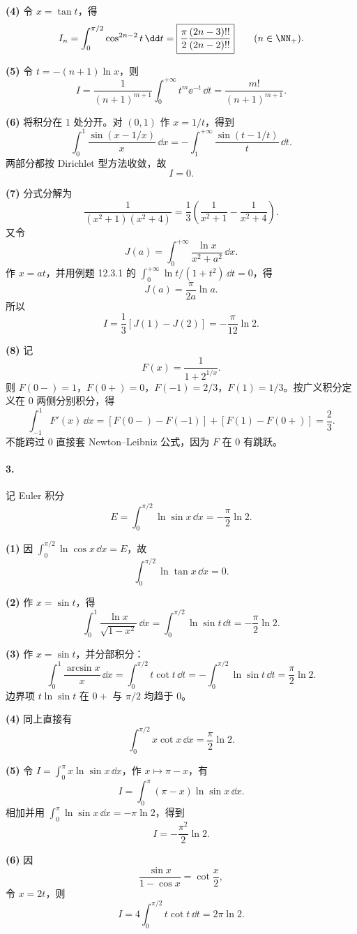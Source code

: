 \textbf{(4)} 令 $x=\tan t$，得
\[
  I_n=\int_0^{\pi/2}\cos^{2n-2}t\,\dd t
  =\boxed{\frac\pi2\frac{(2n-3)!!}{(2n-2)!!}}
  \qquad(n\in\NN_+).
\]

\textbf{(5)} 令 $t=-(n+1)\ln x$，则
\[
  I=\frac1{(n+1)^{m+1}}\int_0^{+\infty}t^m\ee^{-t}\,\dd t
  =\boxed{\frac{m!}{(n+1)^{m+1}}}.
\]

\textbf{(6)} 将积分在 $1$ 处分开。对 $(0,1)$ 作 $x=1/t$，得到
\[
  \int_0^1\frac{\sin(x-1/x)}x\,\dd x
  =-\int_1^{+\infty}\frac{\sin(t-1/t)}t\,\dd t.
\]
两部分都按 Dirichlet 型方法收敛，故
\[
  \boxed{I=0}.
\]

\textbf{(7)} 分式分解为
\[
  \frac1{(x^2+1)(x^2+4)}
  =\frac13\left(\frac1{x^2+1}-\frac1{x^2+4}\right).
\]
又令
\[
  J(a)=\int_0^{+\infty}\frac{\ln x}{x^2+a^2}\,\dd x.
\]
作 $x=at$，并用例题 12.3.1 的 $\int_0^{+\infty}\ln t/(1+t^2)\,\dd t=0$，得
\[
  J(a)=\frac\pi{2a}\ln a.
\]
所以
\[
  \boxed{I=\frac13[J(1)-J(2)]=-\frac\pi{12}\ln2.}
\]

\textbf{(8)} 记
\[
  F(x)=\frac1{1+2^{1/x}}.
\]
则 $F(0-)=1$，$F(0+)=0$，$F(-1)=2/3$，$F(1)=1/3$。按广义积分定义在 $0$ 两侧分别积分，得
\[
  \int_{-1}^1F'(x)\,\dd x
  =[F(0-)-F(-1)]+[F(1)-F(0+)]
  =\boxed{\frac23}.
\]
不能跨过 $0$ 直接套 Newton--Leibniz 公式，因为 $F$ 在 $0$ 有跳跃。

\paragraph{3.}
记 Euler 积分
\[
  E=\int_0^{\pi/2}\ln\sin x\,\dd x=-\frac\pi2\ln2.
\]

\textbf{(1)} 因 $\int_0^{\pi/2}\ln\cos x\,\dd x=E$，故
\[
  \boxed{\int_0^{\pi/2}\ln\tan x\,\dd x=0}.
\]

\textbf{(2)} 作 $x=\sin t$，得
\[
  \boxed{\int_0^1\frac{\ln x}{\sqrt{1-x^2}}\,\dd x
  =\int_0^{\pi/2}\ln\sin t\,\dd t=-\frac\pi2\ln2.}
\]

\textbf{(3)} 作 $x=\sin t$，并分部积分：
\[
  \int_0^1\frac{\arcsin x}{x}\,\dd x
  =\int_0^{\pi/2}t\cot t\,\dd t
  =-\int_0^{\pi/2}\ln\sin t\,\dd t
  =\boxed{\frac\pi2\ln2}.
\]
边界项 $t\ln\sin t$ 在 $0+$ 与 $\pi/2$ 均趋于 $0$。

\textbf{(4)} 同上直接有
\[
  \boxed{\int_0^{\pi/2}x\cot x\,\dd x=\frac\pi2\ln2}.
\]

\textbf{(5)} 令 $I=\int_0^\pi x\ln\sin x\,\dd x$，作 $x\mapsto\pi-x$，有
\[
  I=\int_0^\pi(\pi-x)\ln\sin x\,\dd x.
\]
相加并用 $\int_0^\pi\ln\sin x\,\dd x=-\pi\ln2$，得到
\[
  \boxed{I=-\frac{\pi^2}{2}\ln2}.
\]

\textbf{(6)} 因
\[
  \frac{\sin x}{1-\cos x}=\cot\frac x2,
\]
令 $x=2t$，则
\[
  I=4\int_0^{\pi/2}t\cot t\,\dd t
  =\boxed{2\pi\ln2}.
\]

